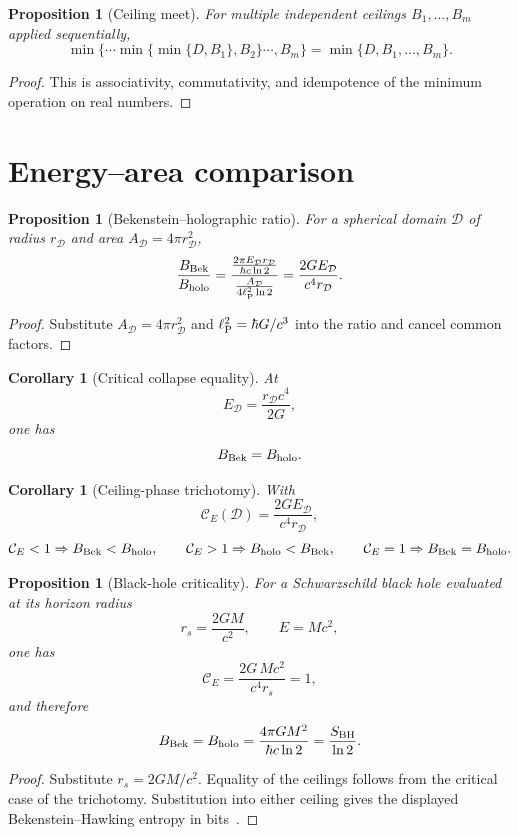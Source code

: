 \documentclass[11pt,a4paper]{article}
\newtheorem{proposition}[theorem]{Proposition}
\newtheorem{corollary}[theorem]{Corollary}
\newcommand{\ellP}{\ell_{\rm P}}
\begin{document}
\begin{proposition}[Ceiling meet]
For multiple independent ceilings $B_1,\dots,B_m$ applied sequentially,
\[
\min\{\cdots\min\{\min\{D,B_1\},B_2\}\cdots,B_m\}
=
\min\{D,B_1,\dots,B_m\}.
\]
\end{proposition}
\begin{proof}
This is associativity, commutativity, and idempotence of the minimum operation on real numbers.
\end{proof}


\section{Energy--area comparison}
\label{sec:energy-area}

\begin{proposition}[Bekenstein--holographic ratio]
For a spherical domain $\mathcal D$ of radius $r_{\mathcal D}$ and area $A_{\mathcal D}=4\pi r_{\mathcal D}^2$,
\[
\frac{B_{\rm Bek}}{B_{\rm holo}}
=
\frac{\frac{2\pi E_{\mathcal D}r_{\mathcal D}}{\hbar c\ln2}}
{\frac{A_{\mathcal D}}{4\ellP^2\ln2}}
=
\frac{2GE_{\mathcal D}}{c^4r_{\mathcal D}}.
\]
\end{proposition}
\begin{proof}
Substitute $A_{\mathcal D}=4\pi r_{\mathcal D}^2$ and $\ellP^2=\hbar G/c^3$ into the ratio and cancel common factors.
\end{proof}

\begin{corollary}[Critical collapse equality]
At
\[
E_{\mathcal D}=\frac{r_{\mathcal D}c^4}{2G},
\]
one has
\[
B_{\rm Bek}=B_{\rm holo}.
\]
\end{corollary}

\begin{corollary}[Ceiling-phase trichotomy]
With
\[
\mathcal C_E(\mathcal D)=
\frac{2GE_{\mathcal D}}{c^4r_{\mathcal D}},
\]
\[
\mathcal C_E<1\Rightarrow B_{\rm Bek}<B_{\rm holo},
\qquad
\mathcal C_E>1\Rightarrow B_{\rm holo}<B_{\rm Bek},
\qquad
\mathcal C_E=1\Rightarrow B_{\rm Bek}=B_{\rm holo}.
\]
\end{corollary}

\begin{proposition}[Black-hole criticality]
For a Schwarzschild black hole evaluated at its horizon radius
\[
r_s=\frac{2GM}{c^2},
\qquad
E=Mc^2,
\]
one has
\[
\mathcal C_E=\frac{2G\,Mc^2}{c^4r_s}=1,
\]
and therefore
\[
B_{\rm Bek}=B_{\rm holo}
=
\frac{4\pi GM^2}{\hbar c\ln2}
=
\frac{S_{\rm BH}}{\ln2}.
\]
\end{proposition}
\begin{proof}
Substitute $r_s=2GM/c^2$.  Equality of the ceilings follows from the critical case of the trichotomy.  Substitution into either ceiling gives the displayed Bekenstein--Hawking entropy in bits~\cite{Bekenstein1973,Bekenstein1981}.
\end{proof}
\end{document}
